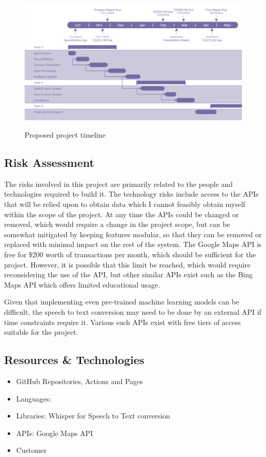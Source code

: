 \begin{figure}[H]
    \centering
	\includegraphics[scale = 0.42]{../document-resources/images/initial-gantt.png}
    \label{initialgantt}
    \caption{Proposed project timeline}
\end{figure}

\subsection{Risk Assessment}
The risks involved in this project are primarily related to the people and technologies required to build it.
The technology risks include access to the APIs that will be relied upon to obtain data which I cannot feasibly obtain myself within the scope of the project.
At any time the APIs could be changed or removed, which would require a change in the project scope, but can be somewhat mitigated by keeping features modular, so that they can be removed or replaced with minimal impact on the rest of the system.
The Google Maps API is free for \$200 worth of transactions per month, which should be sufficient for the project. However, it is possible that this limit be reached, which would require reconsidering the use of the API, but other similar APIs exist such as the Bing Maps API which offers limited educational usage.

Given that implementing even pre-trained machine learning models can be difficult, the speech to text conversion may need to be done by an external API if time constraints require it. Various such APIs exist with free tiers of access suitable for the project.

\subsection{Resources \& Technologies}
\begin{itemize}
    \item GitHub Repositories, Actions and Pages
    \item Languages:
    \item Libraries: Whisper for Speech to Text conversion
    \item APIs: Google Maps API
    \item Customer
\end{itemize}

